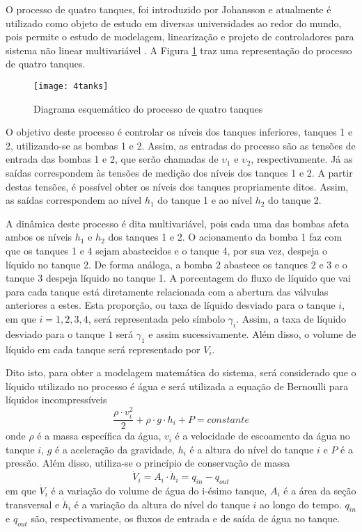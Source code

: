 \begin{example}
 O processo de quatro tanques, foi introduzido por Johansson \cite{article:johansson:2000} e atualmente é utilizado como objeto de estudo em diversas universidades ao redor do mundo, pois permite o estudo de modelagem, linearização e projeto de controladores para sistema não linear multivariável \cite{article:roinila:2008}. A Figura \ref{fig:processo4tanques} traz uma representação do processo de quatro tanques.

\begin{figure}[htbp]
	\centering
	\texttt{[image: 4tanks]}
	\caption{Diagrama esquemático do processo de quatro tanques}
	 \label{fig:processo4tanques}
\end{figure}

O objetivo deste processo é controlar os níveis dos tanques inferiores, tanques 1 e 2, utilizando-se as bombas 1 e 2. Assim, as entradas do processo são as tensões de entrada das bombas 1 e 2, que serão chamadas de $\upsilon_1$ e $\upsilon_2$, respectivamente. Já as saídas correspondem às tensões de medição dos níveis dos tanques 1 e 2. A partir destas tensões, é possível obter os níveis dos tanques propriamente ditos. Assim, as saídas correspondem ao nível $h_1$ do tanque 1 e ao nível $h_2$ do tanque 2.

A dinâmica deste processo é dita multivariável, pois cada uma das bombas afeta ambos os níveis $h_1$ e $h_2$ dos tanques 1 e 2. O acionamento da bomba 1 faz com que os tanques 1 e 4 sejam abastecidos e o tanque 4, por sua vez, despeja o líquido no tanque 2. De forma análoga, a bomba 2 abastece os tanques 2 e 3 e o tanque 3 despeja líquido no tanque 1.
A porcentagem do fluxo de líquido que vai para cada tanque está diretamente relacionada com a abertura das válvulas anteriores a estes. Esta proporção, ou taxa de líquido desviado para o tanque $i$, em que $i = 1, 2, 3, 4$, será representada pelo símbolo $\gamma_i$. Assim, a taxa de líquido desviado para o tanque $1$ será $\gamma_1$ e assim sucessivamente. Além disso, o volume de líquido em cada tanque será representado por $V_i$.

Dito isto, para obter a modelagem matemática do sistema, será considerado que o líquido utilizado no processo é água e será utilizada a equação de Bernoulli para líquidos incompressíveis
\begin{equation}\label{eq:Bernoulli}
 \dfrac{\rho \cdot v_i^2}{2} + \rho  \cdot g  \cdot h_i + P = constante 
\end{equation}
onde $\rho$ é a massa específica da água, $v_i$ é a velocidade de escoamento da água no tanque $i$, $g$ é a aceleração da gravidade, $h_i$ é a altura do nível do tanque $i$ e $P$ é a pressão. Além disso, utiliza-se o princípio de conservação de massa
\begin{equation}\label{eq:cons_massa}
\dot{V}_i = A_i  \cdot \dot{h}_i = q_{in} - q_{out} 
\end{equation}
em que $\dot{V}_i$ é a variação do volume de água do i-ésimo tanque, $A_i$ é a área da seção transversal e $\dot{h}_i$ é a variação da altura do nível do tanque $i$ ao longo do tempo. $q_{in}$ e $q_{out}$ são, respectivamente, os fluxos de entrada e de saída de água no tanque.


\end{example}
